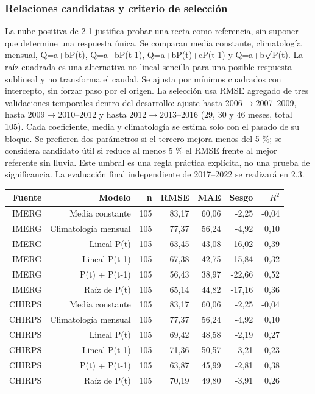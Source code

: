 \subsubsection*{Relaciones candidatas y criterio de selección}
La nube positiva de 2.1 justifica probar una recta como referencia, sin suponer que determine una respuesta única. Se comparan media constante, climatología mensual, Q=a+bP(t), Q=a+bP(t-1), Q=a+bP(t)+cP(t-1) y Q=a+b$\sqrt{\vphantom{P}}$P(t). La raíz cuadrada es una alternativa no lineal sencilla para una posible respuesta sublineal y no transforma el caudal. Se ajusta por mínimos cuadrados con intercepto, sin forzar paso por el origen. La selección usa RMSE agregado de tres validaciones temporales dentro del desarrollo: ajuste hasta 2006$\rightarrow$2007--2009, hasta 2009$\rightarrow$2010--2012 y hasta 2012$\rightarrow$2013--2016 (29, 30 y 46 meses, total 105). Cada coeficiente, media y climatología se estima solo con el pasado de su bloque. Se prefieren dos parámetros si el tercero mejora menos del 5 \%; se considera candidato útil si reduce al menos 5 \% el RMSE frente al mejor referente sin lluvia. Este umbral es una regla práctica explícita, no una prueba de significancia. La evaluación final independiente de 2017--2022 se realizará en 2.3.
\begin{center}\small\begin{tabular}{rrrrrrr}\hline
Fuente & Modelo & n & RMSE & MAE & Sesgo & $R^2$ \\ \hline
IMERG & Media constante & 105 & 83,17 & 60,06 & -2,25 & -0,04 \\
IMERG & Climatología mensual & 105 & 77,37 & 56,24 & -4,92 & 0,10 \\
IMERG & Lineal P(t) & 105 & 63,45 & 43,08 & -16,02 & 0,39 \\
IMERG & Lineal P(t-1) & 105 & 67,38 & 42,75 & -15,84 & 0,32 \\
IMERG & P(t) + P(t-1) & 105 & 56,43 & 38,97 & -22,66 & 0,52 \\
IMERG & Raíz de P(t) & 105 & 65,14 & 44,82 & -17,16 & 0,36 \\
CHIRPS & Media constante & 105 & 83,17 & 60,06 & -2,25 & -0,04 \\
CHIRPS & Climatología mensual & 105 & 77,37 & 56,24 & -4,92 & 0,10 \\
CHIRPS & Lineal P(t) & 105 & 69,42 & 48,58 & -2,19 & 0,27 \\
CHIRPS & Lineal P(t-1) & 105 & 71,36 & 50,57 & -3,21 & 0,23 \\
CHIRPS & P(t) + P(t-1) & 105 & 63,87 & 45,99 & -2,81 & 0,38 \\
CHIRPS & Raíz de P(t) & 105 & 70,19 & 49,80 & -3,91 & 0,26 \\
\hline\end{tabular}\end{center}
